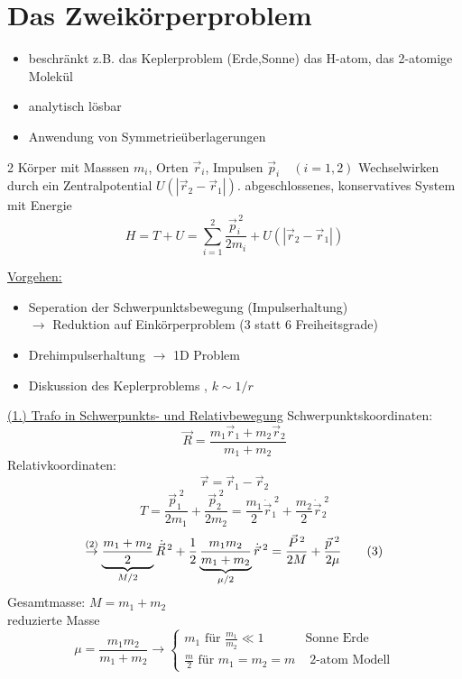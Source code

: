\documentclass[titlepage,12pt,a4paper,ngerman]{report}
\newcommand{\tx}[1]{\textrm{#1}}
\newcommand{\ub}[1]{\underbrace{#1}}
\newcommand{\casess}[4]{\left\{ \begin{array}{ll} {#1} & {#2} \\ {#3} & {#4} \end{array} \right.}
\begin{document}
{\section{Das Zweikörperproblem}
\begin{itemize}
	\item beschränkt z.B. das Keplerproblem (Erde,Sonne) das H-atom, das 2-atomige Molekül
	\item analytisch lösbar
	\item Anwendung von Symmetrieüberlagerungen
\end{itemize}
2 Körper mit Masssen $ m_i $, Orten $ \vec{r}_i $, Impulsen $ \vec{p}_i \quad (i= 1,2)$ Wechselwirken durch ein Zentralpotential $ U(|\vec{r}_2-\vec{r}_1|) $. abgeschlossenes, konservatives System mit Energie
\begin{equation*}
H = T+U = \sum_{i=1}^{2} \frac{\vec{p}^{\,2}_i}{2 m_i} +  U(|\vec{r}_2-\vec{r}_1|) \tag{1}
\end{equation*}

\underline{Vorgehen:}
\begin{itemize}
	\item Seperation der Schwerpunktsbewegung (Impulserhaltung) \\
	$ \rightarrow $ Reduktion auf Einkörperproblem (3 statt 6 Freiheitsgrade)
	\item Drehimpulserhaltung $ \rightarrow $ 1D Problem
	\item Diskussion des Keplerproblems , $ k \sim 1/r $
\end{itemize}

\underline{(1.) Trafo in Schwerpunkts- und Relativbewegung}
Schwerpunktskoordinaten: $$\vec{R} = \frac{m_1\vec{r}_1 + m_2\vec{r}_2}{m_1+m_2}$$
Relativkoordinaten: $$\vec{r} = \vec{r}_1 - \vec{r}_2$$
$$T = \frac{\vec{p}_1^{\;2}}{2m_1} + \frac{\vec{p}^{\;2}_2}{2m_2} = \frac{m_1}{2} \dot{\vec{r}}_1^{\;2} + \frac{m_2}{2} \dot{\vec{r}}_2^{\;2}$$
\begin{equation*}
\buildrel (2) \over \rightarrow  \ub{\frac{m_1+m_2}{2}}_{M / 2} \dot{\vec{R}}^{\,2} + \frac{1}{2} \ub{\frac{m_1 m_2}{ m_1 + m_2}}_{\mu / 2} \dot{\vec{r}}^{\;2} = \frac{\vec{P}^{\,2}}{2 M} + \frac{\vec{p}^{\;2}}{2 \mu} \tag{3}
\end{equation*}
Gesamtmasse: $ M = m_1 + m_2 $\\
reduzierte Masse 
$$ \mu = \frac{m_1 m_2}{m_1 + m_2} \rightarrow \casess{m_1 \tx{ für } \frac{m_1}{m_2} \ll 1}{\tx{Sonne Erde}}{\frac{m}{2} \tx{ für } m_1 = m_2 = m }{\tx{ 2-atom Modell}}$$

}
\end{document}
